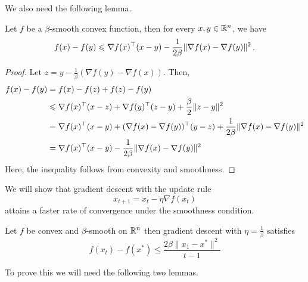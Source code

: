 We also need the following lemma.

\begin{lemma} \label{lm2}
Let $f$ be a $\beta$-smooth convex function, then for every $x,y \in \mathbb{R}^n$, we have
$$f(x) - f(y)\leqslant \nabla f(x)^\top(x-y) - 
\frac{1}{2\beta}\|\nabla f(x) - \nabla f(y)\|^2\,.$$
\end{lemma}

\begin{proof}
Let $z = y - \frac{1}{\beta}(\nabla f(y) - \nabla f(x))$.  Then,
\begin{align*}
f(x) - f(y)
    &= f(x) - f(z) + f(z) - f(y) \\
    &\leqslant \nabla f(x)^\top(x-z) + \nabla f(y)^\top(z-y) + \frac{\beta}{2}\|z-y\|^2 \\
    &= \nabla f(x)^\top(x-y) + (\nabla f(x) - \nabla f(y))^\top(y-z) + \frac{1}{2\beta}\|\nabla f(x) - \nabla f(y)\|^2 \\
    &= \nabla f(x)^\top(x-y) - \frac{1}{2\beta} \|\nabla f(x) - \nabla f(y)\|^2
\end{align*}
Here, the inequality follows from convexity and smoothness.
\end{proof}


We will show that gradient descent with the update rule
$$x_{t+1} = x_t - \eta \nabla f(x_t)$$
attains a faster rate of convergence under the smoothness condition.

\begin{theorem}
Let $f$ be convex and $\beta$-smooth on $\mathbb{R}^n$ then gradient descent with $\eta = \frac{1}{\beta}$ satisfies
$$f(x_t) - f(x^*) \leq \frac{2\beta\|x_1 - x^*\|^2}{t-1}$$
\end{theorem}
To prove this we will need the following two lemmas.


